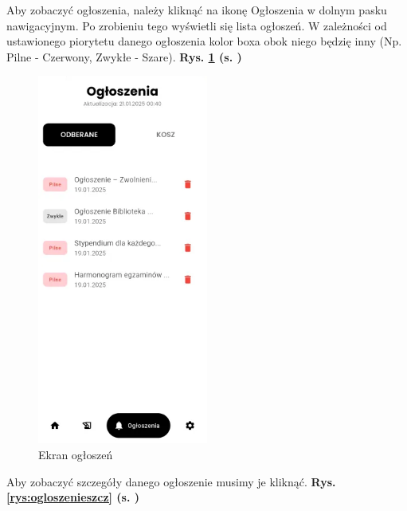 Aby zobaczyć ogłoszenia, należy kliknąć na ikonę Ogłoszenia w dolnym pasku nawigacyjnym. Po zrobieniu tego wyświetli się lista ogłoszeń. W zależności od ustawionego piorytetu danego ogłoszenia kolor boxa obok niego  będzię inny (Np. Pilne - Czerwony, Zwykłe - Szare). \textbf{Rys. \ref{rys:ekranpowiadomien} (s. \pageref{rys:ekranpowiadomien})}
\begin{figure}[h!]
	\centering
	\includegraphics[width=0.5\textwidth]{rys/ekranpowiadomien.png}
	\caption{Ekran ogłoszeń}
	\label{rys:ekranpowiadomien}
\end{figure}
\newpage
Aby zobaczyć szczegóły danego ogłoszenie musimy je kliknąć. \textbf{Rys. \ref{rys:ogloszenieszcz} (s. \pageref{rys:ogloszenieszcz})}
